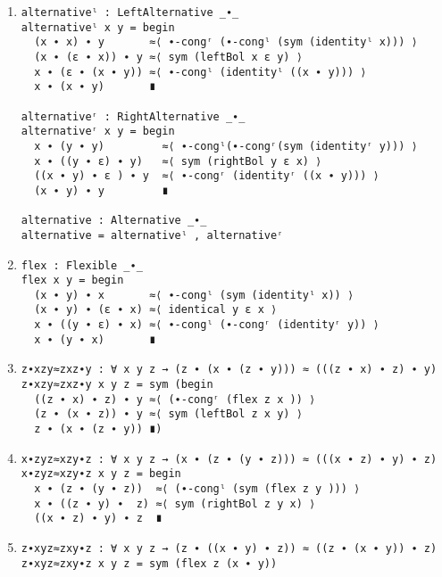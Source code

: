 \begin{enumerate}
\item
\begin{verbatim}
alternativeˡ : LeftAlternative _∙_
alternativeˡ x y = begin
  (x ∙ x) ∙ y       ≈⟨ ∙-congʳ (∙-congˡ (sym (identityˡ x))) ⟩
  (x ∙ (ε ∙ x)) ∙ y ≈⟨ sym (leftBol x ε y) ⟩
  x ∙ (ε ∙ (x ∙ y)) ≈⟨ ∙-congˡ (identityˡ ((x ∙ y))) ⟩
  x ∙ (x ∙ y)       ∎

alternativeʳ : RightAlternative _∙_
alternativeʳ x y = begin
  x ∙ (y ∙ y)         ≈⟨ ∙-congˡ(∙-congʳ(sym (identityʳ y))) ⟩
  x ∙ ((y ∙ ε) ∙ y)   ≈⟨ sym (rightBol y ε x) ⟩
  ((x ∙ y) ∙ ε ) ∙ y  ≈⟨ ∙-congʳ (identityʳ ((x ∙ y))) ⟩
  (x ∙ y) ∙ y         ∎

alternative : Alternative _∙_
alternative = alternativeˡ , alternativeʳ
\end{verbatim}
\item
\begin{verbatim}
flex : Flexible _∙_
flex x y = begin
  (x ∙ y) ∙ x       ≈⟨ ∙-congˡ (sym (identityˡ x)) ⟩
  (x ∙ y) ∙ (ε ∙ x) ≈⟨ identical y ε x ⟩
  x ∙ ((y ∙ ε) ∙ x) ≈⟨ ∙-congˡ (∙-congʳ (identityʳ y)) ⟩
  x ∙ (y ∙ x)       ∎
\end{verbatim}
\item
\begin{verbatim}
z∙xzy≈zxz∙y : ∀ x y z → (z ∙ (x ∙ (z ∙ y))) ≈ (((z ∙ x) ∙ z) ∙ y)
z∙xzy≈zxz∙y x y z = sym (begin
  ((z ∙ x) ∙ z) ∙ y ≈⟨ (∙-congʳ (flex z x )) ⟩
  (z ∙ (x ∙ z)) ∙ y ≈⟨ sym (leftBol z x y) ⟩
  z ∙ (x ∙ (z ∙ y)) ∎)
\end{verbatim}
\item
\begin{verbatim}
x∙zyz≈xzy∙z : ∀ x y z → (x ∙ (z ∙ (y ∙ z))) ≈ (((x ∙ z) ∙ y) ∙ z)
x∙zyz≈xzy∙z x y z = begin
  x ∙ (z ∙ (y ∙ z))  ≈⟨ (∙-congˡ (sym (flex z y ))) ⟩
  x ∙ ((z ∙ y) ∙  z) ≈⟨ sym (rightBol z y x) ⟩
  ((x ∙ z) ∙ y) ∙ z  ∎
\end{verbatim}
\item
\begin{verbatim}
z∙xyz≈zxy∙z : ∀ x y z → (z ∙ ((x ∙ y) ∙ z)) ≈ ((z ∙ (x ∙ y)) ∙ z)
z∙xyz≈zxy∙z x y z = sym (flex z (x ∙ y))
\end{verbatim}
\end{enumerate}